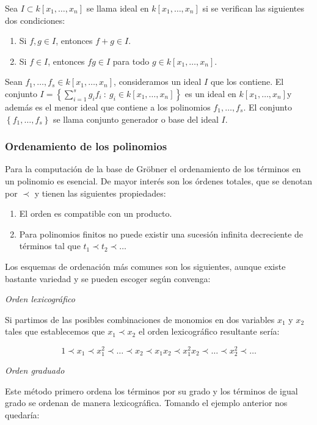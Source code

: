 Sea $I \subset k[x_1, \dotso, x_n]$ se llama ideal en $k[x_1, \dotso, x_n]$ si se verifican las siguientes dos condiciones:

\begin{enumerate}
    \item Si $f, g \in I$, entonces $f + g \in I$.
    \item Si $f \in I$, entonces $fg \in I$ para todo $g \in k[x_1, \dotso, x_n]$.
\end{enumerate}

Sean $f_1, \dotso, f_s \in k[x_1, \dotso, x_n]$, consideramos un ideal $I$ que los contiene. El conjunto $I =  \left\{ \sum_{i=1}^{s} g_i f_i \ : \ g_i \in k[x_1, \dotso, x_n] \right\}$ es un ideal en $k[x_1, \dotso, x_n]$y además es el menor ideal que contiene a los polinomios $f_1, \dotso, f_s$. El conjunto $\left\{ f_1, \dotso, f_s \right\}$ se llama conjunto generador o base del ideal $I$. 

\subsubsection*{Ordenamiento de los polinomios}

Para la computación de la base de Gröbner el ordenamiento de los términos en un polinomio es esencial. De mayor interés son los órdenes totales, que se denotan por $\prec$ y tienen las siguientes propiedades:

\begin{enumerate}
    \item El orden es compatible con un producto.
    \item Para polinomios finitos no puede existir una sucesión infinita decreciente de términos tal que $t_1 \prec t_2 \prec \dotso$
\end{enumerate}

Los esquemas de ordenación más comunes son los siguientes, aunque existe bastante variedad y se pueden escoger según convenga:
\\
\par
\textit{Orden lexicográfico}
\\ \par
Si partimos de las posibles combinaciones de monomios en dos variables $x_1$ y $x_2$ tales que establecemos que $x_1 \prec x_2$ el orden lexicográfico resultante sería:

$$1 \prec x_1 \prec x_1^2 \prec \dotso \prec x_2 \prec x_1 x_2 \prec x_1^2 x_2 \prec \dotso \prec x_2^2 \prec \dotso$$

\bigskip
\textit{Orden graduado}
\\ \par
Este método primero ordena los términos por su grado y los términos de igual grado se ordenan de manera lexicográfica. Tomando el ejemplo anterior nos quedaría:

